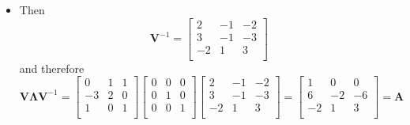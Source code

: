 \documentclass[12pt,a4paper]{article}
\begin{document}
\begin{itemize}
\begin{itemize}
  \item Then
    \begin{equation}\nonumber%
      \bm{V}^{-1}
      =
      \begin{bmatrix}
        2 & -1 & -2 \\
        3 & -1 & -3 \\
        -2 & 1 & 3 \\
      \end{bmatrix}
    \end{equation}
    and therefore
    \begin{equation}\nonumber%
      \bm{V}\bm{\Lambda}\bm{V}^{-1}
      = 
      \begin{bmatrix}
        0 & 1 & 1 \\
        -3 & 2 & 0\\
        1 & 0 & 1 \\
      \end{bmatrix}
      \begin{bmatrix}
        0 & 0 & 0 \\
        0 & 1 & 0 \\
        0 & 0 & 1 \\
      \end{bmatrix}
      \begin{bmatrix}
        2 & -1 & -2 \\
        3 & -1 & -3 \\
        -2 & 1 & 3 \\
      \end{bmatrix}
      =
      \begin{bmatrix}
        1 & 0 & 0 \\
        6 & -2 & -6 \\
        -2 & 1 & 3 \\
      \end{bmatrix}
      = \bm{A}
    \end{equation}
  \end{itemize}

\end{itemize}
\end{document}
